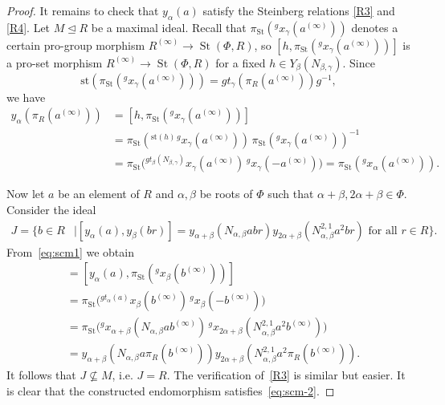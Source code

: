 \documentclass[oneside, 11pt]{amsart}
\numberwithin{equation}{section}
\theoremstyle{definition}
\theoremstyle{remark}
\DeclareMathOperator\St{St}
\newcommand{\up}[2]{{^{#1}\!{#2}}}
\begin{document}
\begin{proof}
 It remains to check that \(y_\alpha(a)\) satisfy the Steinberg relations \eqref{R3} and \eqref{R4}.
 Let \(M \trianglelefteq R\) be a maximal ideal. Recall that \(\pi_{\St}(\up g{x_\gamma(a^{(\infty)})})\) denotes a certain pro-group morphism \(R^{(\infty)} \to \St(\Phi, R)\), so \([h, \pi_{\St}(\up g{x_\gamma(a^{(\infty)})})]\) is a pro-set morphism \(R^{(\infty)} \to \St(\Phi, R)\) for a fixed \(h \in Y_\beta(N_{\beta, \gamma})\). Since
 \[\mathrm{st}(\pi_{\St}(\up g{x_\gamma(a^{(\infty)})})) = g t_\gamma(\pi_R(a^{(\infty)})) g^{-1},\]
 we have
 \begin{align} 
  y_\alpha(\pi_R(a^{(\infty)})) &= [h, \pi_{\St}(\up g{x_\gamma(a^{(\infty)})})] \nonumber \\
  &= \pi_{\St}(\up{\mathrm{st}(h)\, g}{x_\gamma(a^{(\infty)})})\, \pi_{\St}(\up g{x_\gamma(a^{(\infty)})})^{-1} \label{eq:scm1} \\
  &= \pi_{\St}\bigl(\up{g t_\beta(N_{\beta, \gamma})}{x_\gamma(a^{(\infty)})}\, \up g{x_\gamma(-a^{(\infty)})}\bigr) = \pi_{\St}(\up g{x_\alpha(a^{(\infty)})}).\nonumber
 \end{align}
 
 Now let $a$ be an element of $R$ and \(\alpha, \beta\) be roots of $\Phi$ such that \(\alpha + \beta, 2\alpha + \beta \in \Phi\). 
 Consider the ideal
 \begin{align*}
 J = \{b \in R &\mid [y_\alpha(a), y_\beta(br)] = y_{\alpha + \beta}(N_{\alpha, \beta} abr)
 y_{2\alpha + \beta}(N_{\alpha, \beta}^{2,1} a^2 br) \text{ for all } r \in R\}.
 \end{align*}
 From~\eqref{eq:scm1} we obtain 
 \begin{align*}
 [y_\alpha(a), y_\beta(\pi_R(b^{(\infty)}))] &= [y_\alpha(a), \pi_{\St}(\up g{x_\beta(b^{(\infty)})})]\\ 
 &= \pi_{\St}\bigl(\up{g t_\alpha(a)}{x_\beta(b^{(\infty)})}\, \up g{x_\beta(-b^{(\infty)})}\bigr)\\
 &= \pi_{\St}\bigl(\up g{x_{\alpha + \beta}(N_{\alpha, \beta} a b^{(\infty)})}\, \up g{x_{2\alpha + \beta}(N_{\alpha, \beta}^{2,1} a^2 b^{(\infty)})}\bigr)\\
 &= y_{\alpha + \beta}(N_{\alpha, \beta} a \pi_R(b^{(\infty)})) y_{2\alpha + \beta}(N_{\alpha, \beta}^{2,1} a^2 \pi_R(b^{(\infty)})).
 \end{align*}
 It follows that \(J \not \subseteq M\), i.e. \(J = R\). The verification of~\eqref{R3} is similar but easier.   
 It is clear that the constructed endomorphism satisfies~\eqref{eq:scm-2}. \end{proof}
 
\end{document}
